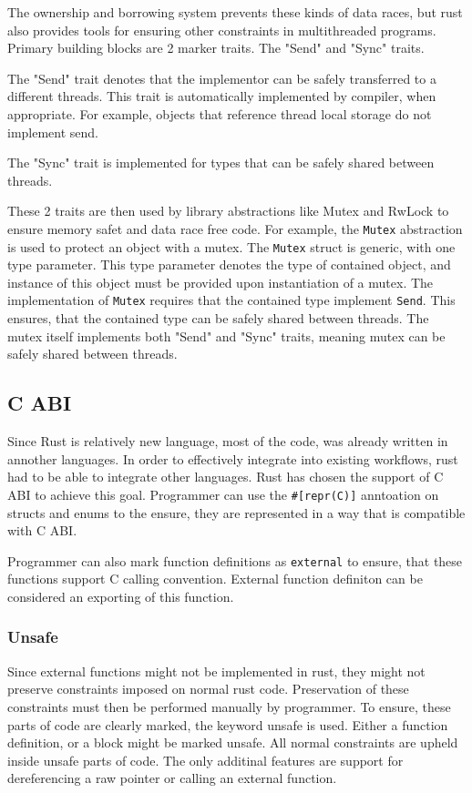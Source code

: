 The ownership and borrowing system prevents these kinds of data races, but rust also provides tools for ensuring other
constraints in multithreaded programs. Primary building blocks are 2 marker traits. The "Send" and "Sync" traits.

The "Send" trait denotes that the implementor can be safely transferred to a different threads. This trait is automatically
implemented by compiler, when appropriate. For example, objects that reference thread local storage do not implement send.

The "Sync" trait is implemented for types that can be safely shared between threads.

These 2 traits are then used by library abstractions like Mutex and RwLock to ensure memory safet and data race free code.
For example, the \verb|Mutex| abstraction is used to protect an object with a mutex. The \verb|Mutex| struct is generic,
with one type parameter. This type parameter denotes the type of contained object, and instance of this object must be provided
upon instantiation of a mutex. The implementation of \verb|Mutex| requires that the contained type implement \verb|Send|.
This ensures, that the contained type can be safely shared between threads. The mutex itself implements both "Send" and "Sync" traits,
meaning mutex can be safely shared between threads.


\subsection{C ABI}
Since Rust is relatively new language, most of the code, was already written in annother languages. In order to
effectively integrate into existing workflows, rust had to be able to integrate other languages. Rust has chosen
the support of C ABI to achieve this goal. Programmer can use the \verb|#[repr(C)]| anntoation on structs and enums to
the ensure, they are represented in a way that is compatible with C ABI.

Programmer can also mark function definitions as \verb|external| to ensure, that these functions support C calling convention.
External function definiton can be considered an exporting of this function.

\subsubsection{Unsafe}
Since external functions might not be implemented in rust, they might not preserve constraints imposed on normal rust code.
Preservation of these constraints must then be performed manually by programmer. To ensure, these parts of code are clearly
marked, the keyword unsafe is used. Either a function definition, or a block might be marked unsafe. All normal constraints
are upheld inside unsafe parts of code. The only additinal features are support for dereferencing a raw pointer or calling
an external function.

